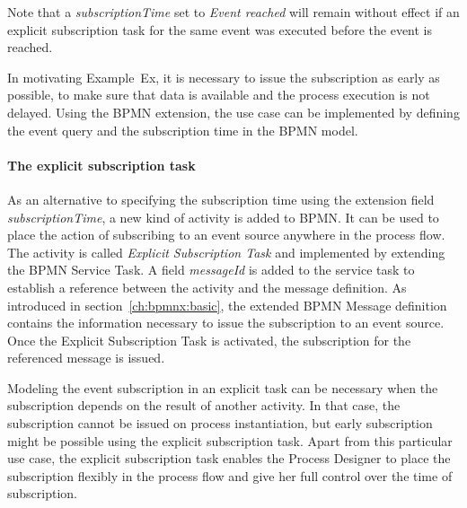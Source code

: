 Note that a \textit{subscriptionTime} set to \textit{Event reached} will remain without effect if an explicit subscription task for the same event was executed before the event is reached.


In motivating Example~Ex, it is necessary to issue the subscription as early as possible, to make sure that data is available and the process execution is not delayed. 
Using the BPMN extension, the use case can be implemented by defining the event query and the subscription time in the BPMN model. 

\paragraph{The explicit subscription task\newline}
As an alternative to specifying the subscription time using the extension field \textit{subscriptionTime}, a new kind of activity is added to BPMN. It can be used to place the action of subscribing to an event source anywhere in the process flow.
The activity is called \textit{Explicit Subscription Task} and implemented by extending the BPMN Service Task. A field \textit{messageId} is added to the service task to establish a reference between the activity and the message definition.
As introduced in section~\autoref{ch:bpmnx:basic}, the extended BPMN Message definition contains the information necessary to issue the subscription to an event source.
Once the Explicit Subscription Task is activated, the subscription for the referenced message is issued. 

Modeling the event subscription in an explicit task can be necessary when the subscription depends on the result of another activity. In that case, the subscription cannot be issued on process instantiation, but early subscription might be possible using the explicit subscription task.
Apart from this particular use case, the explicit subscription task enables the Process Designer to place the subscription flexibly in the process flow and give her full control over the time of subscription.



